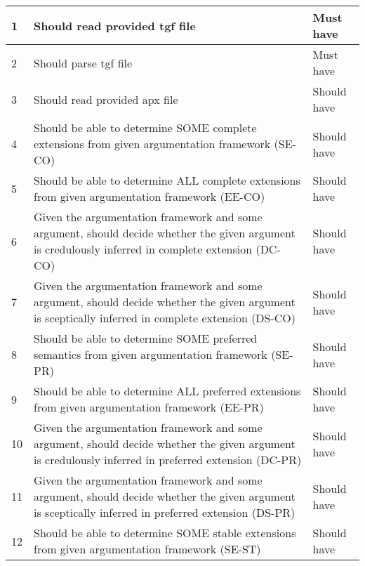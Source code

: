 \begin{center}
\begin{longtable}{| p{} | p{} | p{} |}
1  & Should read provided tgf file                                                                                                                           & Must have   \\ \hline
2  & Should parse tgf file                                                                                                                                   & Must have   \\ \hline
3  & Should read provided apx file                                                                                                                           & Should have \\ \hline
4  & Should be able to determine SOME complete extensions from given argumentation framework (SE-CO)                                                         & Should have \\ \hline
5  & Should be able to determine ALL complete extensions from given argumentation framework (EE-CO)                                                          & Should have \\ \hline
6  & Given the argumentation framework and some argument, should decide whether the given argument is credulously inferred in complete extension (DC-CO)     & Should have \\ \hline
7  & Given the argumentation framework and some argument, should decide whether the given argument is sceptically inferred in complete extension (DS-CO)     & Should have \\ \hline
8  & Should be able to determine SOME preferred semantics from given argumentation framework (SE-PR)                                                         & Should have \\ \hline
9  & Should be able to determine ALL preferred extensions from given argumentation framework (EE-PR)                                                         & Should have \\ \hline
10 & Given the argumentation framework and some argument, should decide whether the given argument is credulously inferred in preferred extension (DC-PR)    & Should have \\ \hline
11 & Given the argumentation framework and some argument, should decide whether the given argument is sceptically inferred in preferred extension (DS-PR)    & Should have \\ \hline
12 & Should be able to determine SOME stable extensions from given argumentation framework (SE-ST)                                                           & Should have \\ \hline

\end{longtable}
\end{center}
